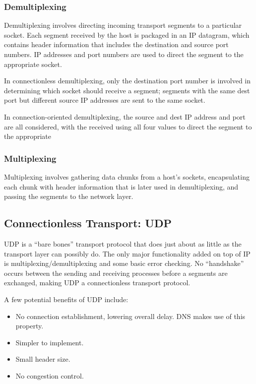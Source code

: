 \documentclass[12pt,titlepage]{article}
\begin{document}
      \subsubsection{Demultiplexing}
        Demultiplexing involves directing incoming transport segments to a particular socket. Each segment received by the host is packaged in an IP datagram, which contains header
        information that includes the destination and source port numbers. IP addresses and port numbers are used to direct the segment to the appropriate socket.

        In connectionless demultiplexing, only the destination port number is involved in determining which socket should receive a segment; segments with the same dest port but
        different source IP addresses are sent to the same socket.

        In connection-oriented demultiplexing, the source and dest IP address and port are all considered, with the received using all four values to direct the segment to the appropriate

      \subsubsection{Multiplexing}
        Multiplexing involves gathering data chunks from a host's sockets, encapsulating each chunk with header information that is later used in demultiplexing, and passing the segments to
        the network layer.

    \subsection{Connectionless Transport: UDP}
      UDP is a ``bare bones'' transport protocol that does just about as little as the transport layer can possibly do. The only major functionality added on top of IP is
      multiplexing/demultiplexing and some basic error checking. No ``handshake'' occurs between the sending and receiving processes before a segments are exchanged, making UDP a
      connectionless transport protocol.

      A few potential benefits of UDP include:
      \begin{itemize}
        \item No connection establishment, lowering overall delay. DNS makes use of this property.
        \item Simpler to implement.
        \item Small header size.
        \item No congestion control.
      \end{itemize}
\end{document}
